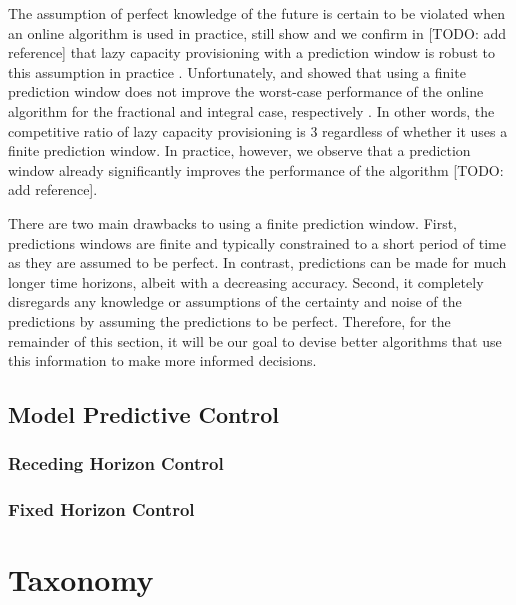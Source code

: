 The assumption of perfect knowledge of the future is certain to be violated when an online algorithm is used in practice, still \citeauthor*{Lin2011} show and we confirm in [TODO: add reference] that lazy capacity provisioning with a prediction window is robust to this assumption in practice \cite{Lin2011}. Unfortunately, \citeauthor*{Lin2011} and \citeauthor*{Albers2018} showed that using a finite prediction window does not improve the worst-case performance of the online algorithm for the fractional and integral case, respectively \cite{Lin2011, Albers2018}. In other words, the competitive ratio of lazy capacity provisioning is $3$ regardless of whether it uses a finite prediction window. In practice, however, we observe that a prediction window already significantly improves the performance of the algorithm [TODO: add reference].

There are two main drawbacks to using a finite prediction window. First, predictions windows are finite and typically constrained to a short period of time as they are assumed to be perfect. In contrast, predictions can be made for much longer time horizons, albeit with a decreasing accuracy. Second, it completely disregards any knowledge or assumptions of the certainty and noise of the predictions by assuming the predictions to be perfect. Therefore, for the remainder of this section, it will be our goal to devise better algorithms that use this information to make more informed decisions.

\subsection{Model Predictive Control}

\subsubsection{Receding Horizon Control}

\subsubsection{Fixed Horizon Control}

\section{Taxonomy}
